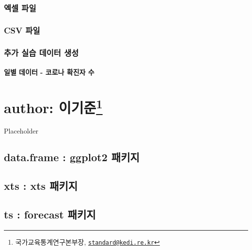 \documentclass[
]{book}
\begin{document}
\hypertarget{uxc5d1uxc140-uxd30cuxc77c}{%
\subsection{엑셀 파일}\label{uxc5d1uxc140-uxd30cuxc77c}}

\hypertarget{csv-uxd30cuxc77c}{%
\subsection{CSV 파일}\label{csv-uxd30cuxc77c}}

\hypertarget{uxcd94uxac00-uxc2e4uxc2b5-uxb370uxc774uxd130-uxc0dduxc131}{%
\subsection{추가 실습 데이터 생성}\label{uxcd94uxac00-uxc2e4uxc2b5-uxb370uxc774uxd130-uxc0dduxc131}}

\hypertarget{uxc77cuxbcc4-uxb370uxc774uxd130---uxcf54uxb85cuxb098-uxd655uxc9c4uxc790-uxc218}{%
\subsubsection{일별 데이터 - 코로나 확진자 수}\label{uxc77cuxbcc4-uxb370uxc774uxd130---uxcf54uxb85cuxb098-uxd655uxc9c4uxc790-uxc218}}

\hypertarget{author-uxc774uxae30uxc900-1}{%
\chapter[author: 이기준]{\texorpdfstring{author: 이기준\footnote{국가교육통계연구본부장, \href{mailto:standard@kedi.re.kr}{\nolinkurl{standard@kedi.re.kr}}}}{author: 이기준}}\label{author-uxc774uxae30uxc900-1}}

Placeholder

\hypertarget{data.frame-ggplot2-uxd328uxd0a4uxc9c0}{%
\section{data.frame : ggplot2 패키지}\label{data.frame-ggplot2-uxd328uxd0a4uxc9c0}}

\hypertarget{xts-xts-uxd328uxd0a4uxc9c0}{%
\section{xts : xts 패키지}\label{xts-xts-uxd328uxd0a4uxc9c0}}

\hypertarget{ts-forecast-uxd328uxd0a4uxc9c0}{%
\section{ts : forecast 패키지}\label{ts-forecast-uxd328uxd0a4uxc9c0}}
\end{document}
